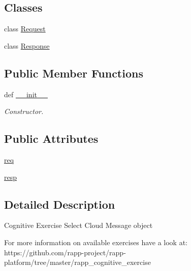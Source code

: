 \subsection*{Classes}
\begin{DoxyCompactItemize}
\item 
class \hyperlink{classRappCloud_1_1CloudMsgs_1_1CognitiveExerciseSelect_1_1CognitiveExerciseSelect_1_1Request}{Request}
\item 
class \hyperlink{classRappCloud_1_1CloudMsgs_1_1CognitiveExerciseSelect_1_1CognitiveExerciseSelect_1_1Response}{Response}
\end{DoxyCompactItemize}
\subsection*{Public Member Functions}
\begin{DoxyCompactItemize}
\item 
def \hyperlink{classRappCloud_1_1CloudMsgs_1_1CognitiveExerciseSelect_1_1CognitiveExerciseSelect_ab552345d2c4d031a988de5cc40bb0152}{\-\_\-\-\_\-init\-\_\-\-\_\-}
\begin{DoxyCompactList}\small\item\em Constructor. \end{DoxyCompactList}\end{DoxyCompactItemize}
\subsection*{Public Attributes}
\begin{DoxyCompactItemize}
\item 
\hyperlink{classRappCloud_1_1CloudMsgs_1_1CognitiveExerciseSelect_1_1CognitiveExerciseSelect_a30b314928e78a7ae2a7eefdecfd71742}{req}
\item 
\hyperlink{classRappCloud_1_1CloudMsgs_1_1CognitiveExerciseSelect_1_1CognitiveExerciseSelect_a5e581a0ab360d2371bca9dabf456bd0d}{resp}
\end{DoxyCompactItemize}


\subsection{Detailed Description}
\begin{DoxyVerb}Cognitive Exercise Select Cloud Message object

For more information on available exercises have a look at:
    https://github.com/rapp-project/rapp-platform/tree/master/rapp_cognitive_exercise
\end{DoxyVerb}
 

